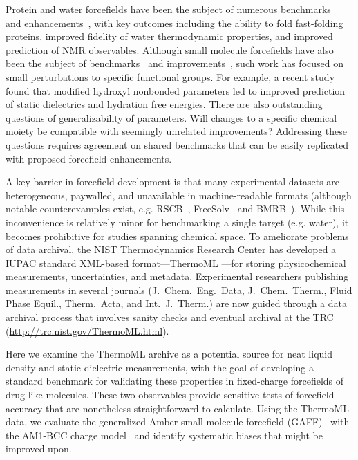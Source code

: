 \documentclass[aps,pre,twocolumn,nofootinbib,superscriptaddress,linenumbers]{revtex4-1}
\begin{document}
Protein and water forcefields have been the subject of numerous benchmarks~\cite{} and enhancements~\cite{}, with key outcomes including the ability to fold fast-folding proteins, improved fidelity of water thermodynamic properties, and improved prediction of NMR observables.  
Although small molecule forcefields have also been the subject of benchmarks~\cite{} and improvements~\cite{}, such work has focused on small perturbations to specific functional groups.  
For example, a recent study found that modified hydroxyl nonbonded parameters led to improved prediction of static dielectrics and hydration free energies.  
There are also outstanding questions of generalizability of parameters.  
Will changes to a specific chemical moiety be compatible with seemingly unrelated improvements?  
Addressing these questions requires agreement on shared benchmarks that can be easily replicated with proposed forcefield enhancements.

A key barrier in forcefield development is that many experimental datasets are heterogeneous, paywalled, and unavailable in machine-readable formats (although notable counterexamples exist, e.g. RSCB~\cite{}, FreeSolv~\cite{freesolv} and BMRB~\cite{}).  
While this inconvenience is relatively minor for benchmarking a single target (e.g. water), it becomes prohibitive for studies spanning chemical space.  
To ameliorate problems of data archival, the NIST Thermodynamics Research Center has developed a IUPAC standard XML-based format---ThermoML \cite{}---for storing physicochemical measurements, uncertainties, and metadata.
 Experimental researchers publishing measurements in several journals (J.~Chem.~Eng.~Data, J.~Chem.~Therm., Fluid Phase Equil., Therm.~Acta, and Int.~J.~Therm.) are now guided through a data archival process that involves sanity checks and eventual archival at the TRC (\url{http://trc.nist.gov/ThermoML.html}).  

Here we examine the ThermoML archive as a potential source for neat liquid density and static dielectric measurements, with the goal of developing a standard benchmark for validating these properties in fixed-charge forcefields of drug-like molecules.  
These two observables provide sensitive tests of forcefield accuracy that are nonetheless straightforward to calculate.  
Using the ThermoML data, we evaluate the generalized Amber small molecule forcefield (GAFF)~\cite{gaff} with the AM1-BCC charge model~\cite{am1bcc1,am1bcc2} and identify systematic biases that might be improved upon.
\end{document}
